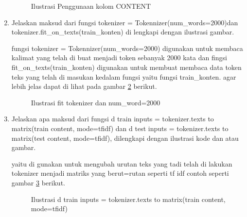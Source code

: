 \begin{enumerate}
\begin{figure}[!htbp]
      \caption{Ilustrasi Penggunaan kolom CONTENT}
      \label{c134}
      \end{figure}

\item Jelaskan maksud dari fungsi tokenizer = Tokennizer(num\_words=2000)dan tokenizer.fit\_on\_texts(train\_konten) di lengkapi dengan ilustrasi gambar.\par
fungsi tokenizer = Tokennizer(num\_words=2000) digunakan untuk membaca kalimat yang telah di buat menjadi token sebanyak 2000 kata dan fingsi fit\_on\_texts(train\_konten) digunakan untuk membuat membaca data token teks yang telah di masukan kedalam fungsi yaitu fungsi train\_konten. agar lebih jelas dapat di lihat pada gambar \ref{c135} berikut.

\begin{figure}[!htbp]
      \caption{Ilustrasi fit tokenizer dan num\_word=2000}
      \label{c135}
      \end{figure}

\item Jelaskan apa maksud dari fungsi d train inputs = tokenizer.texts to matrix(train content, mode=tfidf) dan d test inputs = tokenizer.texts to matrix(test content, mode=tfidf), dilengkapi dengan ilustrasi kode dan atau gambar.\par 
yaitu di gunakan untuk mengubah urutan teks yang tadi telah di lakukan tokenizer menjadi matriks yang berut=rutan seperti tf idf 
contoh seperti gambar \ref{c136} berikut.

\begin{figure}[!htbp]
      \caption{Ilustrasi d train inputs = tokenizer.texts to matrix(train content, mode=tfidf)}
      \label{c136}
      \end{figure}


\end{enumerate}
